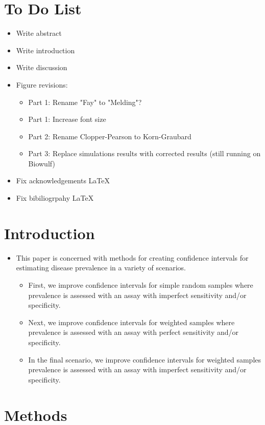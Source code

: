 \documentclass[AMA,STIX1COL]{WileyNJD-v2}
\begin{document}
\section{To Do List}
\begin{itemize}
    \item Write abstract
    \item Write introduction
    \item Write discussion
    \item Figure revisions:
    \begin{itemize}
        \item Part 1: Rename "Fay" to "Melding"?
        \item Part 1: Increase font size
        \item Part 2: Rename Clopper-Pearson to Korn-Graubard
        \item Part 3: Replace simulations results with corrected results (still running on Biowulf)
    \end{itemize}
    \item Fix acknowledgements \LaTeX
    \item Fix bibiliogrpahy \LaTeX
\end{itemize}

\section{Introduction}

\begin{itemize}
    \item This paper is concerned with methods for creating confidence intervals for estimating disease prevalence in a variety of scenarios.
    \begin{itemize}
        \item First, we improve confidence intervals for simple random samples where prevalence is assessed with an assay with imperfect sensitivity and/or specificity.
        \item Next, we improve confidence intervals for weighted samples where prevalence is assessed with an assay with perfect sensitivity and/or specificity.
        \item In the final scenario, we improve confidence intervals for weighted samples prevalence is assessed with an assay with imperfect sensitivity and/or specificity.
    \end{itemize}
\end{itemize}

\section{Methods}
\end{document}
